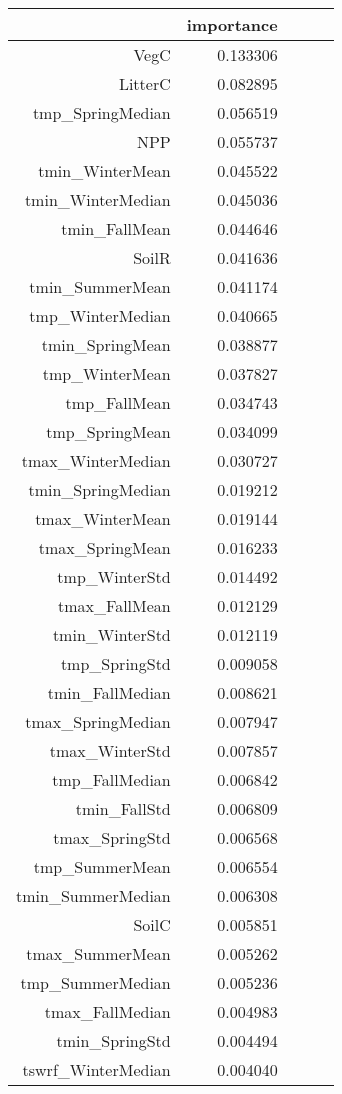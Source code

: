 \begin{tabular}{rrrrr}
\toprule
 & importance \\
\midrule
VegC & 0.133306 \\
LitterC & 0.082895 \\
tmp_SpringMedian & 0.056519 \\
NPP & 0.055737 \\
tmin_WinterMean & 0.045522 \\
tmin_WinterMedian & 0.045036 \\
tmin_FallMean & 0.044646 \\
SoilR & 0.041636 \\
tmin_SummerMean & 0.041174 \\
tmp_WinterMedian & 0.040665 \\
tmin_SpringMean & 0.038877 \\
tmp_WinterMean & 0.037827 \\
tmp_FallMean & 0.034743 \\
tmp_SpringMean & 0.034099 \\
tmax_WinterMedian & 0.030727 \\
tmin_SpringMedian & 0.019212 \\
tmax_WinterMean & 0.019144 \\
tmax_SpringMean & 0.016233 \\
tmp_WinterStd & 0.014492 \\
tmax_FallMean & 0.012129 \\
tmin_WinterStd & 0.012119 \\
tmp_SpringStd & 0.009058 \\
tmin_FallMedian & 0.008621 \\
tmax_SpringMedian & 0.007947 \\
tmax_WinterStd & 0.007857 \\
tmp_FallMedian & 0.006842 \\
tmin_FallStd & 0.006809 \\
tmax_SpringStd & 0.006568 \\
tmp_SummerMean & 0.006554 \\
tmin_SummerMedian & 0.006308 \\
SoilC & 0.005851 \\
tmax_SummerMean & 0.005262 \\
tmp_SummerMedian & 0.005236 \\
tmax_FallMedian & 0.004983 \\
tmin_SpringStd & 0.004494 \\
tswrf_WinterMedian & 0.004040 \\

\end{tabular}
